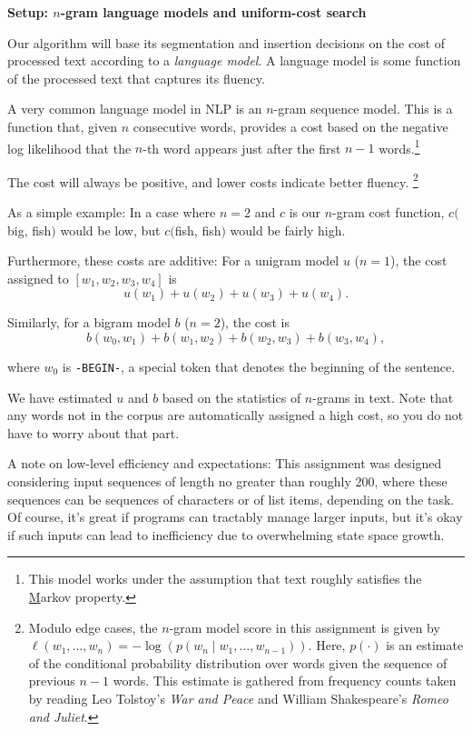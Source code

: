 {\bf Setup: $n$-gram language models and uniform-cost search}

Our algorithm will base its segmentation and insertion decisions on the cost of
processed text according to a {\em language model}. A language model is some
function of the processed text that captures its fluency.

A very common language model in NLP is an $n$-gram sequence model. This is a
function that, given $n$ consecutive words, provides a cost based on the
negative log likelihood that the $n$-th word appears just after the first $n-1$
words.\footnote{This model works under the assumption that text roughly
satisfies the \href{https://en.wikipedia.org/wiki/Markov_property} Markov
 property.}

The cost will always be positive, and lower costs indicate better fluency.
\footnote{Modulo edge cases, the $n$-gram model score in this assignment is
given by $\ell(w_1, \ldots, w_n) = -\log(p(w_n \mid w_1, \ldots, w_{n-1}))$.
Here, $p(\cdot)$ is an estimate of the conditional probability distribution over
words given the sequence of previous $n-1$ words.  This estimate is gathered
from frequency counts taken by reading Leo Tolstoy's {\em War and Peace} and
William Shakespeare's {\em Romeo and Juliet}.}

As a simple example: In a case where $n=2$ and $c$ is our $n$-gram cost
function, $c(${\sf big}, {\sf fish}$)$ would be low, but $c(${\sf fish},
{\sf fish}$)$ would be fairly high.

Furthermore, these costs are additive: For a unigram model $u$ ($n = 1$), the
cost assigned to $[w_1, w_2, w_3, w_4]$ is
\[
u(w_1) + u(w_2) + u(w_3) + u(w_4).
\]

Similarly, for a bigram model $b$ ($n = 2$), the cost is
\[
b(w_0, w_1) +
b(w_1, w_2) +
b(w_2, w_3) +
b(w_3, w_4),
\]

where $w_0$ is {\tt -BEGIN-}, a special token that denotes the beginning of the
sentence.

We have estimated $u$ and $b$ based on the statistics of $n$-grams in text. Note
that any words not in the corpus are automatically assigned a high cost, so you
do not have to worry about that part.

A note on low-level efficiency and expectations: This assignment was designed
considering input sequences of length no greater than roughly 200, where these
sequences can be sequences of characters or of list items, depending on the
task.  Of course, it's great if programs can tractably manage larger inputs, but
it's okay if such inputs can lead to inefficiency due to overwhelming state
space growth.
